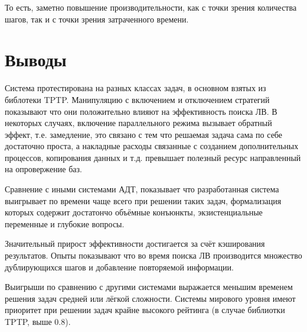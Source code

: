 То есть, заметно повышение производительности, как с точки зрения количества шагов, так и с точки зрения затраченного времени.




\section{Выводы}
Система протестирована на разных классах задач, в основном взятых из библотеки TPTP. Манипуляцию с включением и отключением стратегий показывают что они положительно влияют на эффективность поиска ЛВ. В некоторых случаях, включение параллельного режима вызывает обратный эффект, т.е. замедление, это связано с тем что решаемая задача сама по себе достаточно проста, а  накладные расходы связанные с созданием дополнительных процессов, копирования данных и т.д. превышает полезный ресурс направленный на опровержение баз.

Сравнение с иными системами АДТ, показывает что разработанная система выигрывает по времени чаще всего при решении таких задач, формализация которых содержит достатончо объёмные конъюнкты, экзистенциальные переменные и глубокие вопросы.

Значительный прирост эффективности достигается за счёт кэширования результатов. Опыты показывают что во время поиска ЛВ производится множество дублирующихся шагов и добавление повторяемой информации.

Выигрыши по сравнению с другими системами выражается меньшим временем решения задач средней или лёгкой сложности. Системы мирового уровня имеют приоритет при решении задач крайне высокого рейтинга (в случае библиотки TPTP, выше 0.8).




